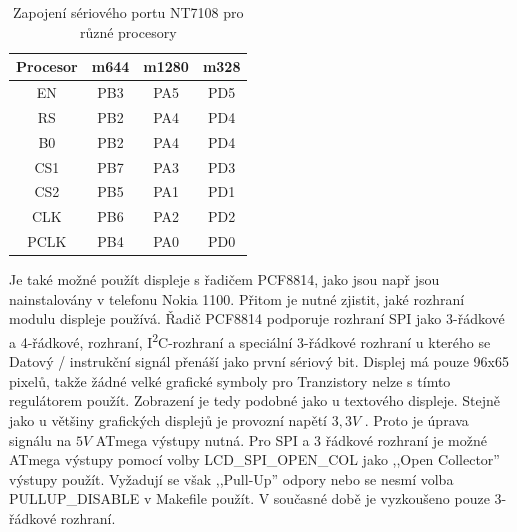 \begin{table}[H]
  \begin{center}
    \begin{tabular}{| c || c | c | c |}
    \hline
 Procesor  & m644  &  m1280  & m328 \\
    \hline
    \hline
  EN        &  PB3  &  PA5   & PD5     \\
    \hline
  RS        &  PB2  &  PA4   & PD4      \\
  B0        &  PB2  &  PA4   & PD4      \\
    \hline
  CS1       &  PB7  &  PA3   & PD3      \\
    \hline
  CS2       &  PB5  &  PA1   & PD1      \\
    \hline
  CLK       &  PB6  &  PA2   & PD2      \\
    \hline
  PCLK      &  PB4  &  PA0   & PD0      \\
    \hline
    \end{tabular}
  \end{center}
  	\vspace{-0.6cm} 
  \caption{Zapojení sériového portu NT7108 pro různé procesory}
  \label{tab:7108-processor}
\end{table}
\vspace{-0.3cm} 
Je také možné použít displeje s řadičem PCF8814, jako jsou např
jsou nainstalovány v telefonu Nokia 1100. Přitom je nutné zjistit, jaké rozhraní modulu displeje
používá. Řadič PCF8814 podporuje rozhraní SPI jako 3-řádkové a 4-řádkové,
rozhraní, I\textsuperscript{2}C-rozhraní a speciální 3-řádkové rozhraní u kterého se
Datový / instrukční signál přenáší jako první sériový bit.
Displej má pouze 96x65 pixelů, takže žádné velké grafické symboly pro
Tranzistory nelze s tímto regulátorem použít. Zobrazení je tedy podobné jako u textového displeje.
Stejně jako u většiny grafických displejů je provozní napětí \(3,3V\) .
Proto je úprava signálu na \(5V\) ATmega výstupy nutná.
Pro SPI a 3 řádkové rozhraní je možné ATmega výstupy pomocí volby LCD\_SPI\_OPEN\_COL jako
 ,,Open Collector'' výstupy použít.
Vyžadují se však ,,Pull-Up'' odpory nebo se nesmí volba PULLUP\_DISABLE v Makefile použít.
V současné době je vyzkoušeno pouze 3-řádkové rozhraní.
